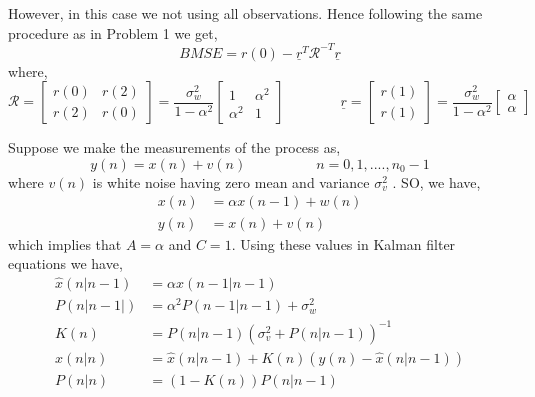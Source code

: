 \documentclass[a4 paper]{article}
\begin{document}
However, in this case we not using all observations. Hence following the same procedure as in Problem 1 we get,
\begin{equation*}
	BMSE = r(0) - \underline{r}^{T} \mathcal{R}^{-T} \underline{r} 
\end{equation*}
where,
\[
\mathcal{R} = 
\begin{bmatrix}
r(0)	& r(2)	\\
r(2)	& r(0)
\end{bmatrix}
= \frac{\sigma_{w}^{2}}{1 - \alpha^{2}}
\begin{bmatrix}
1	& \alpha^{2}	\\
\alpha^{2}	& 1
\end{bmatrix}
\hspace{4em}
\underline{r} =
\begin{bmatrix}
r(1)	\\	r(1) 
\end{bmatrix}
= \frac{\sigma_{w}^{2}}{1 - \alpha^{2}}
\begin{bmatrix}
\alpha	\\	\alpha 
\end{bmatrix}
\]



\newpage
{}

\solution Suppose we make the measurements of the process as, 
\begin{equation*}
	y(n) = x(n) + v(n) \hspace{5em} n = 0, 1, .... , n_{0} -1
\end{equation*}
where $v(n)$ is white noise having zero mean and variance $\sigma_{v}^{2}$ . SO, we have,
\begin{align*}
	x(n) &= \alpha x(n-1) + w(n)	\\
	y(n) &= x(n) + v(n)
\end{align*}
which implies that $A = \alpha$ and $C = 1$. Using these values in Kalman filter equations we have,
\begin{align*}
	\hat{x}(n \vert n-1) &= \alpha x(n-1 \vert n-1) 	\\
	P(n \vert n-1|) &= \alpha^{2} P(n-1 \vert n-1) + \sigma_{w}^{2}	\\
	K(n) &= P(n \vert n-1) (\sigma_{v}^{2} + P(n \vert n-1))^{-1}	\\
	x(n \vert n) &= \hat{x}(n \vert n-1) + K(n)(y(n) - \hat{x}(n \vert n-1))	\\
	P(n \vert n) &= (1 - K(n)) P(n \vert n-1)
\end{align*}
\end{document}
